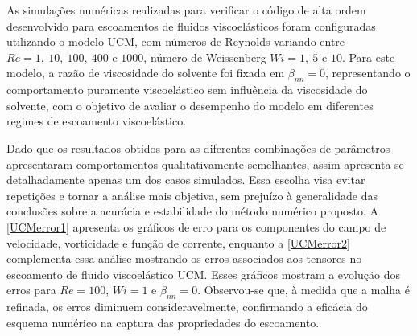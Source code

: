 As simulações numéricas realizadas para verificar o código de alta ordem desenvolvido para escoamentos de fluidos viscoelásticos foram configuradas utilizando o modelo UCM, com números de Reynolds variando entre $Re = 1,\ 10,\ 100,\ 400$ e $1000$, número de Weissenberg $Wi = 1,\ 5$ e $10$. Para este modelo, a razão de viscosidade do solvente foi fixada em $\beta_{nn} = 0$, representando o comportamento puramente viscoelástico sem influência da viscosidade do solvente, com o objetivo de avaliar o desempenho do modelo em diferentes regimes de escoamento viscoelástico.

Dado que os resultados obtidos para as diferentes combinações de parâmetros apresentaram comportamentos qualitativamente semelhantes, assim apresenta-se detalhadamente apenas um dos casos simulados. Essa escolha visa evitar repetições e tornar a análise mais objetiva, sem prejuízo à generalidade das conclusões sobre a acurácia e estabilidade do método numérico proposto. A \autoref{UCMerror1} apresenta os gráficos de erro para os componentes do campo de velocidade, vorticidade e função de corrente, enquanto a \autoref{UCMerror2} complementa essa análise mostrando os erros associados aos tensores no escoamento de fluido viscoelástico UCM. Esses gráficos mostram a evolução dos erros para $Re = 100$, $Wi = 1$ e $\beta_{nn} = 0$. Observou-se que, à medida que a malha é refinada, os erros diminuem consideravelmente, confirmando a eficácia do esquema numérico na captura das propriedades do escoamento.

